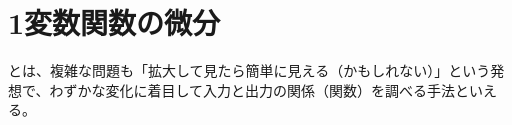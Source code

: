\documentclass[../../topic_calculus]{subfiles}
\begin{document}
\chapter{1変数関数の微分}

とは、複雑な問題も「拡大して見たら簡単に見える（かもしれない）」という発想で、わずかな変化に着目して入力と出力の関係（関数）を調べる手法といえる。











\end{document}
